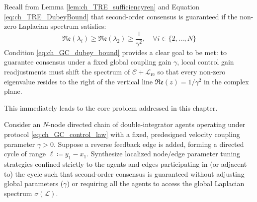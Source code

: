 Recall from Lemma \ref{lem:ch_TRE_sufficiencyren} and Equation \eqref{eq:ch_TRE_DubeyBound} that second-order consensus is guaranteed if the non-zero Laplacian spectrum satisfies:
\begin{equation}\label{eq:ch_GC_dubey_bound}
    \mathfrak{Re}(\lambda_i) \ge \mathfrak{Re}(\lambda_2) \ge \frac{1}{\gamma^2}, \quad \forall i \in \{2, \dots, N\}
\end{equation}
Condition \eqref{eq:ch_GC_dubey_bound} provides a clear goal to be met: to guarantee consensus under a fixed global coupling gain $\gamma$, local control gain readjustments must shift the spectrum of $\mathcal{C} + \mathcal{L}_{\text{re}}$ so that every non-zero eigenvalue resides to the right of the vertical line $\mathfrak{Re}(z) = 1/\gamma^2$ in the complex plane.

This immediately leads to the core problem addressed in this chapter.

\begin{problem}\label{prob:ch_GC_main_problem}
Consider an $N$-node directed chain of double-integrator agents operating under protocol \eqref{eq:ch_GC_control_law} with a fixed, predesigned velocity coupling parameter $\gamma > 0$. Suppose a reverse feedback edge is added, forming a directed cycle of range $\ell \coloneqq y_1 - x_1$. Synthesize localized node/edge parameter tuning strategies confined strictly to the agents and edges participating in (or adjacent to) the cycle such that second-order consensus is guaranteed without adjusting global parameters ($\gamma$) or requiring all the agents to access the global Laplacian spectrum $\sigma(\mathcal{L})$.
\end{problem}

